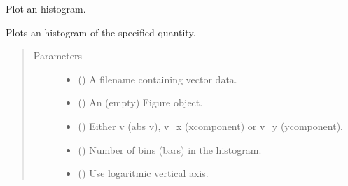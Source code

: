\documentclass[letterpaper,10pt,english]{sphinxmanual}
\begin{document}
\begin{fulllineitems}
\label{\detokenize{vec_plot:openpivgui.vec_plot.histogram}}
Plot an histogram.

Plots an histogram of the specified quantity.
\begin{quote}\begin{description}
\item[{Parameters}] \leavevmode\begin{itemize}
\item {} 
 () \textendash{} A filename containing vector data.

\item {} 
 () \textendash{} An (empty) Figure object.

\item {} 
 () \textendash{} Either v (abs v), v\_x (x\sphinxhyphen{}component) or v\_y (y\sphinxhyphen{}component).

\item {} 
 () \textendash{} Number of bins (bars) in the histogram.

\item {} 
 () \textendash{} Use logaritmic vertical axis.

\end{itemize}

\end{description}\end{quote}

\end{fulllineitems}

\end{document}

